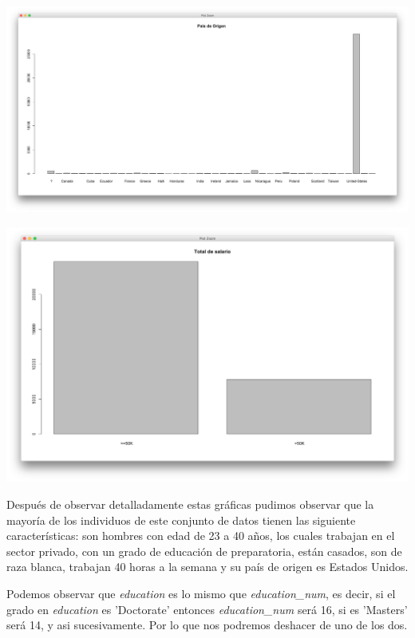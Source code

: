 \documentclass{article}
\begin{document}
 \begin{center}
   \hbox{\hspace{-5.8em}\includegraphics[scale=0.33]{graficas/paisDeOrigen}}
 \end{center}
 \begin{center}
   \hbox{\hspace{-5.8em}\includegraphics[scale=0.4]{graficas/totalDeSalario}}
 \end{center}

 Después de observar detalladamente estas gráficas pudimos observar que la mayoría de los individuos de este conjunto de datos tienen las siguiente características: son hombres con edad de 23 a 40 años, los cuales trabajan en el sector privado, con un grado de educación de preparatoria, están casados, son de raza blanca, trabajan 40 horas a la semana y su país de origen es Estados Unidos.

Podemos observar que {\it education} es lo mismo que {\it education\_num}, es decir, si el grado en {\it education} es 'Doctorate' entonces {\it education\_num} será 16, si es 'Masters' será 14, y asi sucesivamente. Por lo que nos podremos deshacer de uno de los dos.
\end{document}
